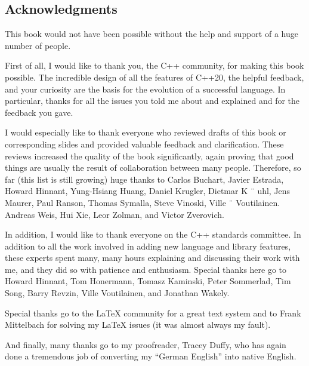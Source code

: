 \subsection*{Acknowledgments}

This book would not have been possible without the help and support of a huge number of people.

First of all, I would like to thank you, the C++ community, for making this book possible. The incredible design of all the features of C++20, the helpful feedback, and your curiosity are the basis for the evolution of a successful language. In particular, thanks for all the issues you told me about and explained and for the feedback you gave.

I would especially like to thank everyone who reviewed drafts of this book or corresponding slides and provided valuable feedback and clarification. These reviews increased the quality of the book significantly, again proving that good things are usually the result of collaboration between many people. Therefore, so far (this list is still growing) huge thanks to Carlos Buchart, Javier Estrada, Howard Hinnant, Yung-Hsiang Huang, Daniel Krugler, Dietmar K ¨ uhl, Jens Maurer, Paul Ranson, Thomas Symalla, Steve Vinoski, Ville ¨ Voutilainen. Andreas Weis, Hui Xie, Leor Zolman, and Victor Zverovich.

In addition, I would like to thank everyone on the C++ standards committee. In addition to all the work involved in adding new language and library features, these experts spent many, many hours explaining and discussing their work with me, and they did so with patience and enthusiasm. Special thanks here go to Howard Hinnant, Tom Honermann, Tomasz Kaminski, Peter Sommerlad, Tim Song, Barry Revzin, Ville Voutilainen, and Jonathan Wakely.

Special thanks go to the LaTeX community for a great text system and to Frank Mittelbach for solving my \LaTeX{} issues (it was almost always my fault).

And finally, many thanks go to my proofreader, Tracey Duffy, who has again done a tremendous job of converting my “German English” into native English.



















